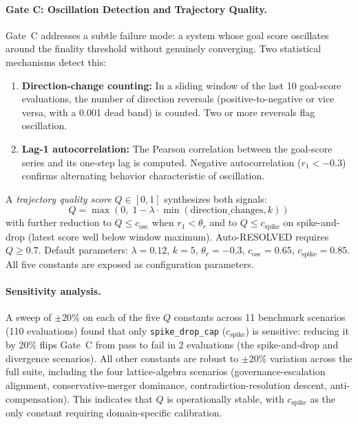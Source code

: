 \documentclass[11pt]{article}
\begin{document}
\paragraph{Gate C: Oscillation Detection and Trajectory Quality.}
Gate~C addresses a subtle failure mode: a system whose goal score oscillates around the finality threshold without genuinely converging. Two statistical mechanisms detect this:

\begin{enumerate}
  \item \textbf{Direction-change counting:} In a sliding window of the last 10 goal-score evaluations, the number of direction reversals (positive-to-negative or vice versa, with a 0.001 dead band) is counted. Two or more reversals flag oscillation.
  \item \textbf{Lag-1 autocorrelation:} The Pearson correlation between the goal-score series and its one-step lag is computed. Negative autocorrelation ($r_1 < -0.3$) confirms alternating behavior characteristic of oscillation.
\end{enumerate}

A \emph{trajectory quality score} $Q \in [0, 1]$ synthesizes both signals:
\[
Q = \max\!\left(0,\; 1 - \lambda \cdot \min(\text{direction\_changes}, k)\right)
\]
with further reduction to $Q \leq c_{\text{osc}}$ when $r_1 < \theta_r$ and to $Q \leq c_{\text{spike}}$ on spike-and-drop (latest score well below window maximum). Auto-RESOLVED requires $Q \geq 0.7$. Default parameters: $\lambda = 0.12$, $k = 5$, $\theta_r = -0.3$, $c_{\text{osc}} = 0.65$, $c_{\text{spike}} = 0.85$. All five constants are exposed as configuration parameters.

\paragraph{Sensitivity analysis.} A sweep of $\pm 20\%$ on each of the five $Q$ constants across 11 benchmark scenarios (110 evaluations) found that only \texttt{spike\_drop\_cap} ($c_{\text{spike}}$) is sensitive: reducing it by 20\% flips Gate~C from pass to fail in 2 evaluations (the spike-and-drop and divergence scenarios). All other constants are robust to $\pm 20\%$ variation across the full suite, including the four lattice-algebra scenarios (governance-escalation alignment, conservative-merger dominance, contradiction-resolution descent, anti-compensation). This indicates that $Q$ is operationally stable, with $c_{\text{spike}}$ as the only constant requiring domain-specific calibration.
\end{document}
